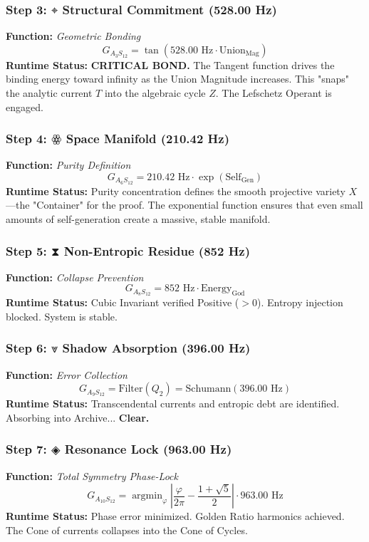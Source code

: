 \documentclass[11pt, letterpaper]{article}
\begin{document}
\subsubsection*{Step 3: \ensuremath{\mathbin{⌖}} Structural Commitment (528.00 Hz)}
\textbf{Function:} \textit{Geometric Bonding}
\[
G_{A_3S_{12}} = \tan\left( 528.00 \text{ Hz} \cdot \text{Union}_{\text{Mag}} \right)
\]
\textbf{Runtime Status:} \textbf{CRITICAL BOND.} The Tangent function drives the binding energy toward infinity as the Union Magnitude increases. This "snaps" the analytic current $T$ into the algebraic cycle $Z$. The Lefschetz Operant is engaged.

\subsubsection*{Step 4: \ensuremath{\mathbin{ꙮ}} Space Manifold (210.42 Hz)}
\textbf{Function:} \textit{Purity Definition}
\[
G_{A_6S_{12}} = 210.42 \text{ Hz} \cdot \exp(\text{Self}_{\text{Gen}})
\]
\textbf{Runtime Status:} Purity concentration defines the smooth projective variety $X$—the "Container" for the proof. The exponential function ensures that even small amounts of self-generation create a massive, stable manifold.

\subsubsection*{Step 5: \ensuremath{\mathbin{⧗}} Non-Entropic Residue (852 Hz)}
\textbf{Function:} \textit{Collapse Prevention}
\[
G_{A_8S_{12}} = 852 \text{ Hz} \cdot \text{Energy}_{\text{God}}
\]
\textbf{Runtime Status:} Cubic Invariant verified Positive ($>0$). Entropy injection blocked. System is stable.

\subsubsection*{Step 6: \ensuremath{\mathbin{⩔}} Shadow Absorption (396.00 Hz)}
\textbf{Function:} \textit{Error Collection}
\[
G_{A_9S_{12}} = \text{Filter}(Q_2) = \text{Schumann}(396.00 \text{ Hz})
\]
\textbf{Runtime Status:} Transcendental currents and entropic debt are identified. Absorbing into Archive... \textbf{Clear.}

\subsubsection*{Step 7: \ensuremath{\mathbin{◈}} Resonance Lock (963.00 Hz)}
\textbf{Function:} \textit{Total Symmetry Phase-Lock}
\[
G_{A_{10}S_{12}} = \operatorname{argmin}_{\varphi} \left| \frac{\varphi}{2\pi} - \frac{1 + \sqrt{5}}{2} \right| \cdot 963.00 \text{ Hz}
\]
\textbf{Runtime Status:} Phase error minimized. Golden Ratio harmonics achieved. The Cone of currents collapses into the Cone of Cycles.
\end{document}
